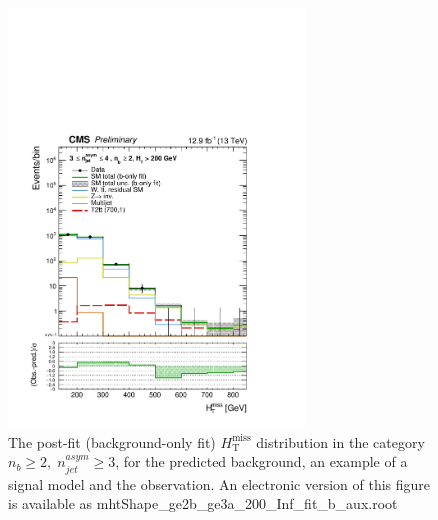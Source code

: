\begin{figure}[tbhp]
    \caption{ 
    The post-fit (background-only fit) $H_{\mathrm{T}}^{\mathrm{miss}}$ distribution in the category $n_{b}\geq 2, \; n_{jet}^{asym} \geq 3$, 
    for the predicted background, an example of a signal model and the observation.
    An electronic version of this figure is available as mhtShape\_ge2b\_ge3a\_200\_Inf\_fit\_b\_aux.root
    \label{fig:mhtShape_ge2b_ge3a_fit_b} }
  \begin{center}
  \includegraphics[width=0.7\textwidth]{mhtShape_ge2b_ge3a_200_Inf_fit_b_aux}
  \end{center}
\end{figure}


